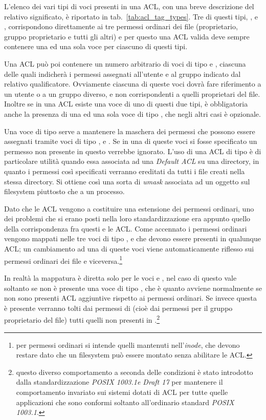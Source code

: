 L'elenco dei vari tipi di voci presenti in una ACL, con una breve descrizione
del relativo significato, è riportato in tab.~\ref{tab:acl_tag_types}. Tre di
questi tipi, ,  e
, corrispondono direttamente ai tre permessi ordinari dei
file (proprietario, gruppo proprietario e tutti gli altri) e per questo una
ACL valida deve sempre contenere una ed una sola voce per ciascuno di questi
tipi.

Una ACL può poi contenere un numero arbitrario di voci di tipo
 e , ciascuna delle quali indicherà i
permessi assegnati all'utente e al gruppo indicato dal relativo qualificatore.
Ovviamente ciascuna di queste voci dovrà fare riferimento a un utente o a un
gruppo diverso, e non corrispondenti a quelli proprietari del file. Inoltre se
in una ACL esiste una voce di uno di questi due tipi, è obbligatoria anche la
presenza di una ed una sola voce di tipo , che negli altri
casi è opzionale.

Una voce di tipo  serve a mantenere la maschera dei permessi
che possono essere assegnati tramite voci di tipo ,
 e . Se in una di queste voci si
fosse specificato un permesso non presente in  questo
verrebbe ignorato. L'uso di una ACL di tipo  è di particolare
utilità quando essa associata ad una \textit{Default ACL} su una directory, in
quanto i permessi così specificati verranno ereditati da tutti i file creati
nella stessa directory. Si ottiene così una sorta di \textit{umask} associata
ad un oggetto sul filesystem piuttosto che a un processo.

Dato che le ACL vengono a costituire una estensione dei permessi ordinari, uno
dei problemi che si erano posti nella loro standardizzazione era appunto
quello della corrispondenza fra questi e le ACL. Come accennato i permessi
ordinari vengono mappati nelle tre voci di tipo ,
 e  che devono essere presenti in
qualunque ACL; un cambiamento ad una di queste voci viene automaticamente
riflesso sui permessi ordinari dei file e viceversa.\footnote{per permessi
  ordinari si intende quelli mantenuti nell'\textit{inode}, che devono restare
  dato che un filesystem può essere montato senza abilitare le ACL.}

In realtà la mappatura è diretta solo per le voci  e
, nel caso di  questo vale soltanto
se non è presente una voce di tipo , che è quanto avviene
normalmente se non sono presenti ACL aggiuntive rispetto ai permessi
ordinari. Se invece questa è presente verranno tolti dai permessi di
 (cioè dai permessi per il gruppo proprietario del
file) tutti quelli non presenti in .\footnote{questo diverso
  comportamento a seconda delle condizioni è stato introdotto dalla
  standardizzazione \textit{POSIX 1003.1e Draft 17} per mantenere il
  comportamento invariato sui sistemi dotati di ACL per tutte quelle
  applicazioni che sono conformi soltanto all'ordinario standard \textit{POSIX
    1003.1}.}

